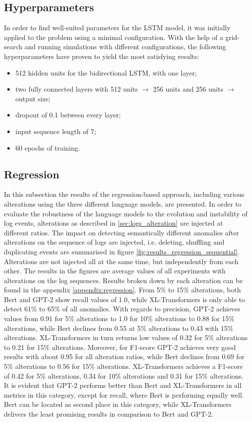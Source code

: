 \subsection{Hyperparameters}
In order to find well-suited parameters for the LSTM model, it was initially applied to the problem using a minimal configuration. With the help of a grid-search and running simulations with different configurations, the following hyperparameters have proven to yield the most satisfying results:
\begin{itemize}
	\item 512 hidden units for the bidirectional LSTM, with one layer;
	\item two fully connected layers with 512 units $\rightarrow$ 256 units and 256 units $\rightarrow$ output size;
	\item dropout of 0.1 between every layer;
	\item input sequence length of 7;
	\item 60 epochs of training.
\end{itemize}

\subsection{Regression\label{sec:results-regression}}
In this subsection the results of the regression-based approach, including various alterations using the three different language models, are presented. In order to evaluate the robustness of the language models to the evolution and instability of log events, alterations as described in \ref{sec:logs_alteration} are injected at different ratios. The impact on detecting semantically different anomalies after alterations on the sequence of logs are injected, i.e. deleting, shuffling and duplicating events are summarised in figure \ref{fig:results_regression_sequential}. Alterations are not injected all at the same time, but independently from each other. The results in the figures are average values of all experiments with alterations on the log sequences. Results broken down by each alteration can be found in the appendix \ref{appendix:regression}. From 5\% to 15\% alterations, both Bert and GPT-2 show recall values of 1.0, while XL-Transformers is only able to detect 61\% to 65\% of all anomalies. With regards to precision, GPT-2 achieves values from 0.91 for 5\% alterations to 1.0 for 10\% alterations to 0.88 for 15\% alterations, while Bert declines from 0.55 at 5\% alterations to 0.43 with 15\% alterations. XL-Transformers in turn returns low values of 0.32 for 5\% alterations to 0.21 for 15\% alterations. Moreover, for F1-score GPT-2 achieves very good results with about 0.95 for all alteration ratios, while Bert declines from 0.69 for 5\% alterations to 0.56 for 15\% alterations. XL-Transformers achieves a F1-score of 0.42 for 5\% alterations, 0.34 for 10\% alterations and 0.31 for 15\% alterations. It is evident that GPT-2 performs better than Bert and XL-Transformers in all metrics in this category, except for recall, where Bert is performing equally well. Bert can be located as second place in this category, while XL-Transformers delivers the least promising results in comparison to Bert and GPT-2.

